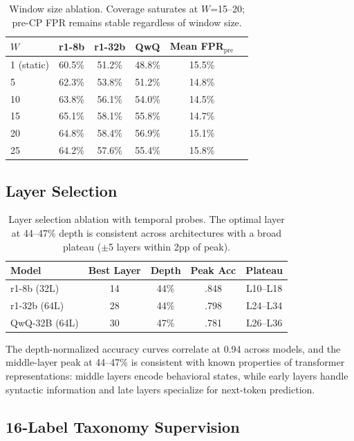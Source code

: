 \documentclass[11pt,a4paper]{article}
\begin{document}
\begin{table}[t]
\centering
\small
\caption{Window size ablation. Coverage saturates at $W$=15--20; pre-CP FPR remains stable regardless of window size.}
\label{tab:window}
\begin{tabular}{lccccc}
\toprule
$W$ & r1-8b & r1-32b & QwQ & Mean FPR$_{\text{pre}}$ \\
\midrule
1 (static) & 60.5\% & 51.2\% & 48.8\% & 15.5\% \\
5 & 62.3\% & 53.8\% & 51.2\% & 14.8\% \\
10 & 63.8\% & 56.1\% & 54.0\% & 14.5\% \\
15 & 65.1\% & 58.1\% & 55.8\% & 14.7\% \\
20 & 64.8\% & 58.4\% & 56.9\% & 15.1\% \\
25 & 64.2\% & 57.6\% & 55.4\% & 15.8\% \\
\bottomrule
\end{tabular}
\end{table}

\subsection{Layer Selection}
\label{sec:layer_ablation}

\begin{table}[t]
\centering
\small
\caption{Layer selection ablation with temporal probes. The optimal layer at 44--47\% depth is consistent across architectures with a broad plateau ($\pm$5 layers within 2pp of peak).}
\label{tab:layer_ablation}
\begin{tabular}{lcccc}
\toprule
Model & Best Layer & Depth & Peak Acc & Plateau \\
\midrule
r1-8b (32L) & 14 & 44\% & .848 & L10--L18 \\
r1-32b (64L) & 28 & 44\% & .798 & L24--L34 \\
QwQ-32B (64L) & 30 & 47\% & .781 & L26--L36 \\
\bottomrule
\end{tabular}
\end{table}

The depth-normalized accuracy curves correlate at 0.94 across models, and the middle-layer peak at 44--47\% is consistent with known properties of transformer representations: middle layers encode behavioral states, while early layers handle syntactic information and late layers specialize for next-token prediction.

\subsection{16-Label Taxonomy Supervision}
\end{document}
